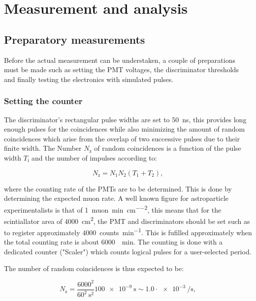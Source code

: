 \chapter{Measurement and analysis}

\section{Preparatory measurements}

Before the actual measurement can be understaken, a couple of preparations must be made such as setting the PMT voltages, the discriminator thresholds and finally testing the electronics with simulated pulses.

\subsection{Setting the counter}

The discriminator's rectangular pulse widths are set to \SI{50}{\nano\second}, this provides long enough pulses for the coincidences while also minimizing the amount of random coincidences which arise from the overlap of two successive pulses due to their finite width. The Number $N_{\text{z}}$ of random coincidences is a function of the pulse width $T_{\text{i}}$ and the number of impulses according to:

\begin{equation}
N_{\text{z}}=N_1 N_2(T_1+T_2),
\end{equation}

where the counting rate of the PMTs are to be determined. This is done by determining the expected muon rate. A well known figure for astroparticle experimentalists is that of \SI{1}{muon\per\minute\per\centi\meter\squared}, this means that for the scintiallator area of \SI{4000}{\centi\meter\squared}, the PMT and discriminators should be set such as to register approximately \SI{4000}{counts\per\minute}. This is fufilled approximately when the total counting rate is about \SI{6000}{\per\minute}. The counting is done with a dedicated counter ("Scaler") which counts logical pulses for a user-selected period.

The number of random coincidences is thus expected to be:

\begin{equation}
N_{\text{z}}=\frac{6000^2}{60^2 \: \si{\second\squared}}\SI{100e-9}{\second}\sim 1.0 \cdot \SI{e-3}{\per\second},
\end{equation}

